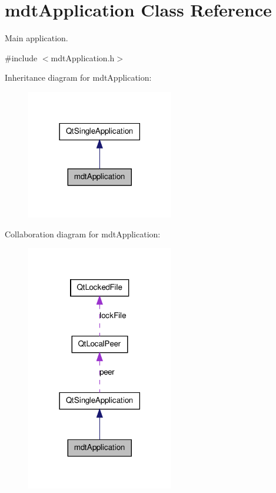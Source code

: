 \hypertarget{classmdt_application}{
\section{mdtApplication Class Reference}
\label{classmdt_application}
}


Main application.  




{\ttfamily \#include $<$mdtApplication.h$>$}



Inheritance diagram for mdtApplication:
\nopagebreak
\begin{figure}[H]
\begin{center}
\leavevmode
\includegraphics[width=182pt]{classmdt_application__inherit__graph}
\end{center}
\end{figure}


Collaboration diagram for mdtApplication:
\nopagebreak
\begin{figure}[H]
\begin{center}
\leavevmode
\includegraphics[width=182pt]{classmdt_application__coll__graph}
\end{center}
\end{figure}
